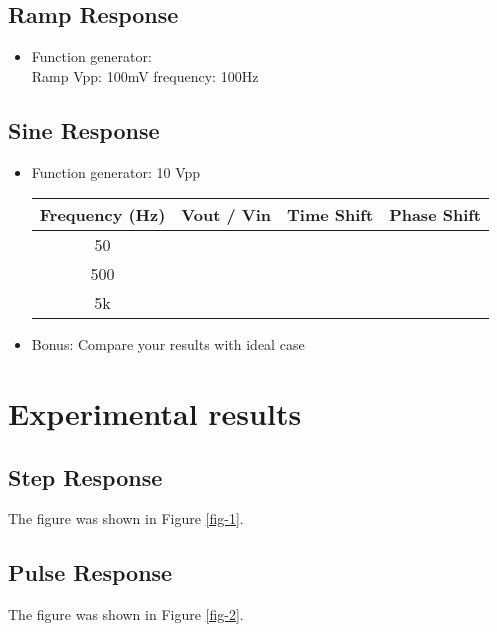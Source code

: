 \documentclass{article}
\begin{document}
\subsection{Ramp Response}
\begin{itemize}
	\item Function generator:\\
	Ramp \qquad Vpp: 100mV \qquad frequency: 100Hz
\end{itemize}

\subsection{Sine Response}
\begin{itemize}
	\item Function generator: 10 Vpp
	\begin{center}
		\begin{tabular}{|c|c|c|c|}
			\hline
			Frequency (Hz) & Vout / Vin & Time Shift & Phase Shift \\
			\hline
			50 &&&\\
			\hline
			500 &&&\\
			\hline
			5k &&&\\
			\hline
		\end{tabular}
	\end{center}
	\item Bonus: Compare your results with ideal case
\end{itemize}

\section{Experimental results}

\subsection{Step Response}
The figure was shown in Figure \ref{fig-1}.


\subsection{Pulse Response}
The figure was shown in Figure \ref{fig-2}.

\end{document}
